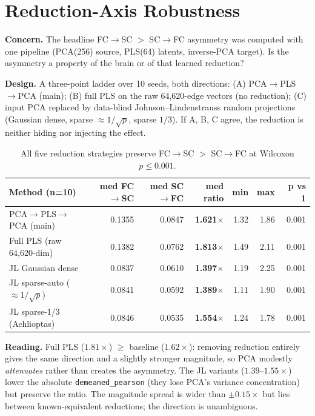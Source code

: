 \documentclass{article}
\newcommand{\fcsc}{FC$\rightarrow$SC}
\newcommand{\scfc}{SC$\rightarrow$FC}
\newcommand{\dpear}{\texttt{demeaned\_pearson}}
\begin{document}
\FloatBarrier
\section{Reduction-Axis Robustness}

\textbf{Concern.} The headline \fcsc{} $>$ \scfc{} asymmetry was computed with one pipeline
(PCA(256) source, PLS(64) latents, inverse-PCA target). Is the asymmetry a property of the
brain or of that learned reduction?

\textbf{Design.} A three-point ladder over 10 seeds, both directions: (A) PCA$\rightarrow$PLS
$\rightarrow$PCA (main); (B) full PLS on the raw 64{,}620-edge vectors (no reduction); (C)
input PCA replaced by data-blind Johnson--Lindenstrauss random projections (Gaussian dense,
sparse $\approx 1/\sqrt{p}$, sparse $1/3$). If A, B, C agree, the reduction is neither hiding
nor injecting the effect.

\begin{table}[h]
\centering\small
\caption{All five reduction strategies preserve \fcsc{} $>$ \scfc{} at Wilcoxon $p\le 0.001$.}
\begin{tabular}{@{}lrrrrrr@{}}
\toprule
\textbf{Method (n=10)} & \textbf{med \fcsc} & \textbf{med \scfc} & \textbf{med ratio} & \textbf{min} & \textbf{max} & \textbf{p vs 1} \\
\midrule
PCA$\rightarrow$PLS$\rightarrow$PCA (main) & 0.1355 & 0.0847 & \textbf{1.621$\times$} & 1.32 & 1.86 & 0.001 \\
Full PLS (raw 64{,}620-dim) & 0.1382 & 0.0762 & \textbf{1.813$\times$} & 1.49 & 2.11 & 0.001 \\
JL Gaussian dense & 0.0837 & 0.0610 & \textbf{1.397$\times$} & 1.19 & 2.25 & 0.001 \\
JL sparse-auto ($\approx 1/\sqrt{p}$) & 0.0841 & 0.0592 & \textbf{1.389$\times$} & 1.11 & 1.90 & 0.001 \\
JL sparse-1/3 (Achlioptas) & 0.0846 & 0.0535 & \textbf{1.554$\times$} & 1.24 & 1.78 & 0.001 \\
\bottomrule
\end{tabular}
\end{table}

\textbf{Reading.} Full PLS ($1.81\times$) $\ge$ baseline ($1.62\times$): removing reduction
entirely gives the same direction and a slightly stronger magnitude, so PCA modestly
\emph{attenuates} rather than creates the asymmetry. The JL variants ($1.39$--$1.55\times$)
lower the absolute \dpear{} (they lose PCA's variance concentration) but preserve the ratio.
The magnitude spread is wider than $\pm 0.15\times$ but lies between known-equivalent
reductions; the direction is unambiguous.
\end{document}
